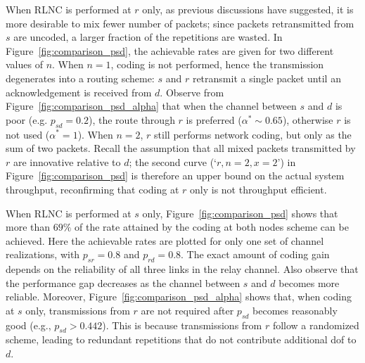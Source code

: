 \documentclass[journal, letterpaper]{IEEEtran}
\begin{document}
When RLNC is performed at $r$ only, as previous discussions have suggested, it is more desirable to mix fewer number of packets; since packets retransmitted from $s$ are uncoded, a larger fraction of the repetitions are wasted. In Figure~\ref{fig:comparison_psd}, the achievable rates are given for two different values of $n$. When $n=1$, coding is not performed, hence the transmission degenerates into a routing scheme: $s$ and $r$ retransmit a single packet until an acknowledgement is received from $d$. Observe from Figure~\ref{fig:comparison_psd_alpha} that when the channel between $s$ and $d$ is poor (e.g. $p_{sd}=0.2$), the route through $r$ is preferred ($\alpha^* \sim 0.65$), otherwise $r$ is not used ($\alpha^* = 1$). When $n=2$, $r$ still performs network coding, but only as the sum of two packets. Recall the assumption that all mixed packets transmitted by $r$ are innovative relative to $d$; the second curve (`$r, n=2, x=2$') in Figure~\ref{fig:comparison_psd} is therefore an upper bound on the actual system throughput, reconfirming that coding at $r$ only is not throughput efficient.

When RLNC is performed at $s$ only, Figure~\ref{fig:comparison_psd} shows that more than $69\%$ of the rate attained by the coding at both nodes scheme can be achieved. Here the achievable rates are plotted for only one set of channel realizations, with $p_{sr}=0.8$ and $p_{rd}=0.8$. The exact amount of coding gain depends on the reliability of all three links in the relay channel. Also observe that the performance gap decreases as the channel between $s$ and $d$ becomes more reliable. Moreover, Figure~\ref{fig:comparison_psd_alpha} shows that, when coding at $s$ only, transmissions from $r$ are not required after $p_{sd}$ becomes reasonably good (e.g., $p_{sd} > 0.442$). This is because transmissions from $r$ follow a randomized scheme, leading to redundant repetitions that do not contribute additional dof to $d$.
\end{document}
